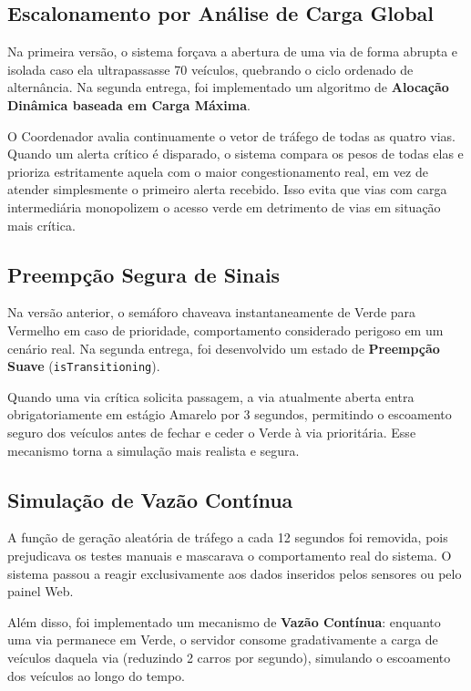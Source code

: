 \documentclass[12pt]{article}
\begin{document}
\subsection{Escalonamento por Análise de Carga Global}

Na primeira versão, o sistema forçava a abertura de uma via de forma abrupta e isolada caso ela ultrapassasse 70 veículos, quebrando o ciclo ordenado de alternância. Na segunda entrega, foi implementado um algoritmo de \textbf{Alocação Dinâmica baseada em Carga Máxima}.

O Coordenador avalia continuamente o vetor de tráfego de todas as quatro vias. Quando um alerta crítico é disparado, o sistema compara os pesos de todas elas e prioriza estritamente aquela com o maior congestionamento real, em vez de atender simplesmente o primeiro alerta recebido. Isso evita que vias com carga intermediária monopolizem o acesso verde em detrimento de vias em situação mais crítica.

\subsection{Preempção Segura de Sinais}

Na versão anterior, o semáforo chaveava instantaneamente de Verde para Vermelho em caso de prioridade, comportamento considerado perigoso em um cenário real. Na segunda entrega, foi desenvolvido um estado de \textbf{Preempção Suave} (\texttt{isTransitioning}).

Quando uma via crítica solicita passagem, a via atualmente aberta entra obrigatoriamente em estágio Amarelo por 3 segundos, permitindo o escoamento seguro dos veículos antes de fechar e ceder o Verde à via prioritária. Esse mecanismo torna a simulação mais realista e segura.

\subsection{Simulação de Vazão Contínua}

A função de geração aleatória de tráfego a cada 12 segundos foi removida, pois prejudicava os testes manuais e mascarava o comportamento real do sistema. O sistema passou a reagir exclusivamente aos dados inseridos pelos sensores ou pelo painel Web.

Além disso, foi implementado um mecanismo de \textbf{Vazão Contínua}: enquanto uma via permanece em Verde, o servidor consome gradativamente a carga de veículos daquela via (reduzindo 2 carros por segundo), simulando o escoamento dos veículos ao longo do tempo.
\end{document}
